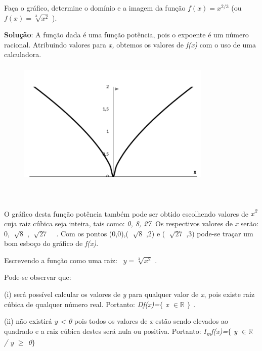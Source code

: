 \begin{texemplo}

Faça o gráfico, determine o domínio e a imagem da função  \( f \left( x \right) =x^{2/3} \)  (ou  \( f \left( x \right) =\sqrt[3]{x^{2}} \) ).

\textbf{Solução}: A função dada é uma função potência, pois o expoente é um número racional. Atribuindo valores para \textit{x,} obtemos os valores de \textit{f(x)} com o uso de uma calculadora. 

\begin{figure}[H]
\begin{Center}
        \includegraphics[width=3.65in,height=2.35in]{capitulos/outras_funcoes/media/image2.pdf}
    \end{Center}
\end{figure}
~~

\quad O gráfico desta função potência também pode ser obtido escolhendo valores de \textit{x\textsuperscript{2}} cuja raiz cúbica seja inteira, tais como: \textit{0, 8, 27}. Os respectivos valores de \textit{x} serão: 0,  \( \sqrt[]{8} \) ,  \( \sqrt[]{27} \) ~ . Com os pontos (0,0),( \( \sqrt[]{8} \) ,2) e ( \( \sqrt[]{27} \) ,3) pode-se traçar um bom esboço do gráfico de \textit{f(x)}.

\quad Escrevendo a função como uma raiz:~  \( y=\sqrt[3]{x^{2}} \) .

Pode-se observar que: 

(i) será possível calcular os valores de \textit{y} para qualquer valor de \textit{x}, pois existe raiz cúbica de qualquer número real. Portanto: \textit{Df(x)=$ \{ $  x $ \in \mathbb{R} $  $ \} $ .}

(ii) não existirá \textit{y < 0} pois todos os valores de \textit{x} estão sendo elevados ao quadrado e a raiz cúbica destes será nula ou positiva. Portanto: \textit{I\textsubscript{m}f(x)=$ \{ $ y $ \in \mathbb{R} $   / y $ \geq $  0$ \} $ }\qedsymbol{}
\end{texemplo}
 
